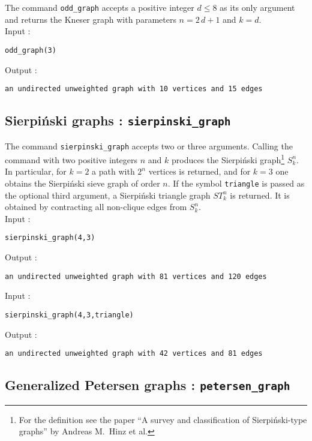 \documentclass[a4paper,11pt]{article}
\begin{document}
The command {\tt odd\_graph} accepts a positive integer $ d\leq 8 $ as its only argument and returns the Kneser graph with parameters $ n=2\,d+1 $ and $ k=d $.\\
Input :
\begin{center}
  \tt odd\_graph(3)
\end{center}
Output :
\begin{center}
  \tt an undirected unweighted graph with 10 vertices and 15 edges
\end{center}

\subsection{Sierpiński graphs : {\tt sierpinski\_graph}}

The command {\tt sierpinski\_graph} accepts two or three arguments. Calling the command with two positive integers $ n $ and $ k $ produces the Sierpiński graph\footnote{For the definition see the paper ``A survey and classification of Sierpiński-type
graphs'' by Andreas M.~Hinz et al.} $ S_k^n $. In particular, for $ k=2 $ a path with $ 2^n $ vertices is returned, and for $ k=3 $ one obtains the Sierpiński sieve graph of order $ n $. If the symbol {\tt triangle} is passed as the optional third argument, a Sierpiński triangle graph $ ST_k^n $ is returned. It is obtained by contracting all non-clique edges from $ S_k^n $.\\
Input :
\begin{center}
  \tt sierpinski\_graph(4,3)
\end{center}
Output :
\begin{center}
  \tt an undirected unweighted graph with 81 vertices and 120 edges
\end{center}
Input :
\begin{center}
  \tt sierpinski\_graph(4,3,triangle)
\end{center}
Output :
\begin{center}
  \tt an undirected unweighted graph with 42 vertices and 81 edges
\end{center}

\subsection{Generalized Petersen graphs : {\tt petersen\_graph}}
\end{document}
